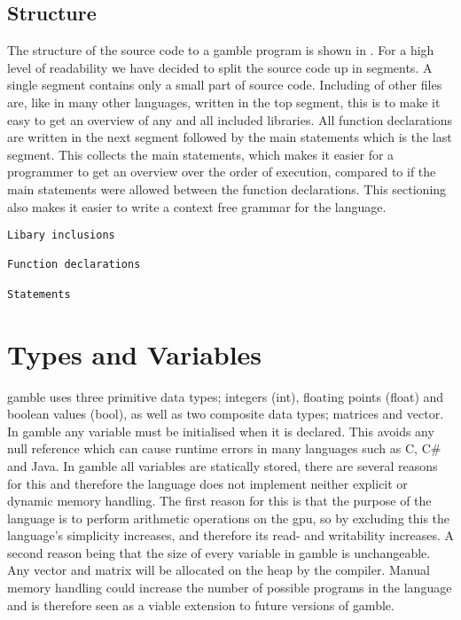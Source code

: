 \subsection*{Structure}\label{subsec:Struc}
The structure of the source code to a \gls{gamble} program is shown in .
For a high level of readability we have decided  to split the source code up in segments.
A single segment contains only a small part of source code.
Including of other files are, like in many other languages, written in the top segment, this is to make it easy to get an overview of any and all included libraries. 
All function declarations are written in the next segment followed by the main statements which is the last segment.
This collects the main statements, which makes it easier for a programmer to get an overview over the order of execution, compared to if the main statements were allowed between the function declarations.
This sectioning also makes it easier to write a context free grammar for the language.

\begin{lstlisting}[caption={Source code file layout in \gls{gamble}},frame=tlrb,label={lst:Structure}, numbers=none]
Libary inclusions

Function declarations

Statements
\end{lstlisting}

\section{Types and Variables}\label{sec:Types}
\gls{gamble} uses three primitive data types; integers (int), floating points (float) and boolean values (bool), as well as two composite data types; matrices and vector. 
In \gls{gamble} any variable must be initialised when it is declared. 
This avoids any null reference which can cause runtime errors in many languages such as C, C\# and Java.
In \gls{gamble} all variables are statically stored, there are several reasons for this and therefore the language does not implement neither explicit or dynamic memory handling.
The first reason for this is that the purpose of the language is to perform arithmetic operations on the \acrshort{gpu}, so by excluding this the language's simplicity increases, and therefore its read- and writability increases.
A second reason being that the size of every variable in \gls{gamble} is unchangeable.
Any vector and matrix will be allocated on the heap by the compiler.
Manual memory handling could increase the number of possible programs in the language and is therefore seen as a viable extension to future versions of \gls{gamble}.


